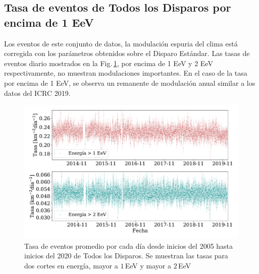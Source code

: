 \subsection{Tasa de eventos de Todos los Disparos por encima de 1 EeV}

Los eventos de este conjunto de datos, la modulación espuria del clima está corregida con los parámetros obtenidos sobre el Disparo Estándar. Las tasas de eventos diario mostrados en la Fig.\,\ref{fig:rate_ALL}, por encima de 1 EeV y 2 EeV respectivamente, no muestran modulaciones importantes. En el caso de la tasa por encima de 1 EeV, se observa un remanente de modulación anual similar a los datos del ICRC 2019. 


\begin{figure}[H]
  \centering
  \includegraphics[width=\textwidth]{../04_Clima/Graphs/rate_dayly/AllTriggers_1EeV_2EeV_rate.pdf}
  \caption{Tasa de eventos promedio por cada día desde inicios del 2005 hasta inicios del 2020 de Todos los Disparos. Se muestran las tasas para dos cortes en energía, mayor a $1\,$EeV y mayor a $2\,$EeV}\label{fig:rate_ALL}
\end{figure}


